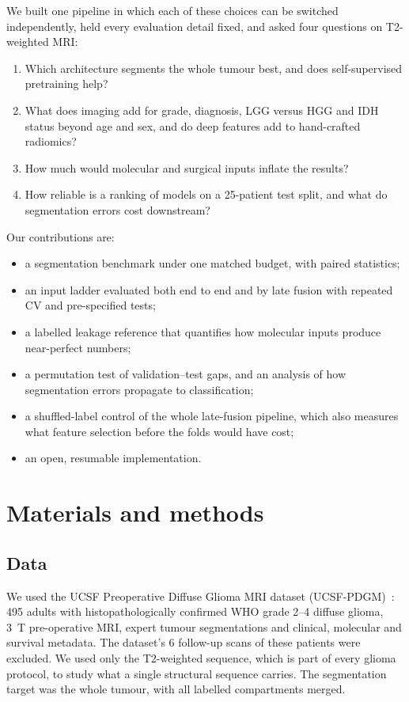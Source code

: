 \documentclass[11pt]{article}
\begin{document}
We built one pipeline in which each of these choices can be switched independently, held every evaluation detail
fixed, and asked four questions on T2-weighted MRI:
\begin{enumerate}
  \item Which architecture segments the whole tumour best, and does self-supervised pretraining help?
  \item What does imaging add for grade, diagnosis, LGG versus HGG and IDH status beyond age and sex, and do deep
        features add to hand-crafted radiomics?
  \item How much would molecular and surgical inputs inflate the results?
  \item How reliable is a ranking of models on a 25-patient test split, and what do segmentation errors cost
        downstream?
\end{enumerate}
Our contributions are:
\begin{itemize}
  \item a segmentation benchmark under one matched budget, with paired statistics;
  \item an input ladder evaluated both end to end and by late fusion with repeated CV and pre-specified tests;
  \item a labelled leakage reference that quantifies how molecular inputs produce near-perfect numbers;
  \item a permutation test of validation--test gaps, and an analysis of how segmentation errors propagate to
        classification;
  \item a shuffled-label control of the whole late-fusion pipeline, which also measures what feature selection
        before the folds would have cost;
  \item an open, resumable implementation.
\end{itemize}

\section{Materials and methods}

\subsection{Data}
We used the UCSF Preoperative Diffuse Glioma MRI dataset (UCSF-PDGM)~\cite{calabrese2022ucsf}: 495 adults with
histopathologically confirmed WHO grade 2--4 diffuse glioma, 3~T pre-operative MRI, expert tumour segmentations and
clinical, molecular and survival metadata. The dataset's 6 follow-up scans of these patients were excluded. We used
only the T2-weighted sequence, which is part of every glioma protocol, to study what a single structural sequence
carries. The segmentation target was the whole tumour, with all labelled compartments merged.
\end{document}
